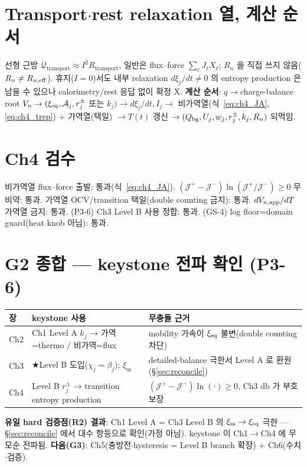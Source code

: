 \section{Transport$\cdot$rest relaxation 열, 계산 순서}\label{sec:ch4_transport}
선형 근방 $\dot{\mathcal Q}_{\mathrm{transport}}\approx I^2R_{\mathrm{transport}}$, 일반은 flux--force
$\sum_\ell J_\ell X_\ell$; $R_n$ 을 직접 쓰지 않음($R_n\ne R_{n,\mathrm{eff}}$). 휴지($I=0$)서도 내부 relaxation
$d\xi_j/dt\ne0$ 의 entropy production 은 남을 수 있으나 calorimetry/rest 응답 없이 확정 X.
\textbf{계산 순서}: $q\to$charge-balance root $V_n\to(\xi_{\mathrm{eq}},\mathcal A_j,r_j^\pm$ 또는 $k_j)\to
d\xi_j/dt,I_j\to$ 비가역열(식~\eqref{eq:ch4_JA},\eqref{eq:ch4_trep}) + 가역열(택일) $\to T(t)$ 갱신
$\to (Q_{\mathrm{bg}},U_j,w_j,r_j^\pm,k_j,R_n)$ 되먹임.

\section{Ch4 검수}\label{sec:ch4_check}
{\small 비가역열 flux--force 출발: 통과(식~\eqref{eq:ch4_JA}). $(\mathcal J^+-\mathcal J^-)\ln(\mathcal J^+/\mathcal J^-)\ge0$
무비약: 통과. 가역열 OCV/transition 택일(double counting 금지): 통과. $dV_{n,\mathrm{app}}/dT$ 가역열 금지:
통과. (P3-6) Ch3 Level B 사용 정합: 통과. (GS-4) log floor=domain guard(heat knob 아님): 통과.}

\section*{G2 종합 — keystone 전파 확인 (P3-6)}
\begin{longtable}{p{} p{} p{}}
\toprule 장 & keystone 사용 & 무충돌 근거 \\ \midrule \endhead
Ch2 & Ch1 Level A $k_j$ → 가역=thermo / 비가역=flux & mobility 가속이 $\xi_{\mathrm{eq}}$ 불변(double counting 차단) \\
Ch3 & ★Level B 도입($\chi_j=\beta_j$); $\xi_{\mathrm{ss}}$ & detailed-balance 극한서 Level A 로 환원(\S\ref{sec:reconcile}) \\
Ch4 & Level B $r_j^\pm$ → transition entropy production & $(\mathcal J^+-\mathcal J^-)\ln(\cdot)\ge0$, Ch3 db 가 부호 보장 \\
\bottomrule
\end{longtable}
\textbf{유일 hard 검증점(R2) 결과}: Ch1 Level A = Ch3 Level B 의 $\xi_{\mathrm{ss}}\to\xi_{\mathrm{eq}}$ 극한 —
\S\ref{sec:reconcile} 에서 대수 항등으로 확인(가정 아님). keystone 이 Ch1$\to$Ch4 에 무모순 전파됨.
\textbf{다음(G3)}: Ch5(충방전$\cdot$hysteresis = Level B branch 확장) + Ch6(수치$\cdot$검증).

